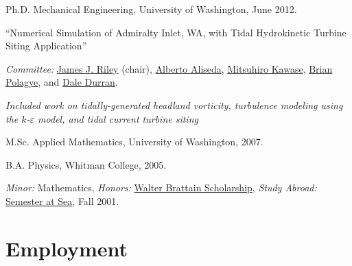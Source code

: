 \documentclass[10pt,letterpaper]{article}
\renewenvironment{itemize}{
  \begin{list}{}{
    \setlength{\leftmargin}{1.5em}
    \setlength{\itemsep}{0.25em}
    \setlength{\parskip}{0pt}
    \setlength{\parsep}{0.25em}
  }
}{
  \end{list}
}
\begin{document}
\begin{itemize}

  \item Ph.D. Mechanical Engineering, University of Washington, June 2012.

    \begin{itemize}
	\item   ``Numerical Simulation of Admiralty Inlet, WA, with Tidal Hydrokinetic Turbine Siting Application''
    \item \textit{Committee:}
      \href{http://faculty.washington.edu/rileyj/}{James J. Riley} (chair),
      \href{http://www.me.washington.edu/research/faculty/aaliseda/}{Alberto Aliseda},
      \href{http://faculty.washington.edu/kawase/}{Mitsuhiro Kawase},
      \href{http://www.me.washington.edu/research/faculty/bpolagye/}{Brian Polagye}, and
      \href{http://www.atmos.washington.edu/~durrand/}{Dale Durran}.

    \item \textit{Included work on tidally-generated headland vorticity, turbulence modeling using the $k$-$\varepsilon$ model, and tidal current turbine siting}

    \end{itemize}

  \item M.Sc. Applied Mathematics, University of Washington, 2007.

  \item B.A. Physics, Whitman College, 2005.

    \begin{itemize}

    \item \textit{Minor:} Mathematics, \textit{Honors:} \href{https://www.whitman.edu/content/catalog/financial-aid}{Walter Brattain Scholarship}, \textit{Study Abroad:}
      \href{http://www.semesteratsea.org/}{Semester at Sea},
      Fall 2001.

    \end{itemize}

\end{itemize}

\section*{Employment}
\end{document}
